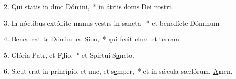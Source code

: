 2. Qui statis in dmo D\uline{ó}mini,~* in átriis doms Dei n\uline{o}stri.\par 
3. In nóctibus extóllite manus vestrs in s\uline{a}ncta,~* et benedícte Dóm\uline{i}num.\par 
4. Benedícat te Dómins ex S\uline{i}on,~* qui fecit clum et t\uline{e}rram.\par 
5. Glória Patr, et F\uline{í}lio,~* et Spirtui S\uline{a}ncto.\par 
6. Sicut erat in princípio, et nnc, et s\uline{e}mper,~* et in sǽcula sæclórum. \uline{A}men.\par 
